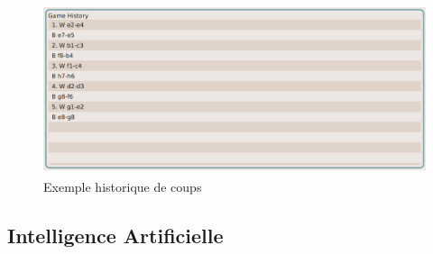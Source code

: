 \documentclass{article}
\begin{document}
\begin{figure}[h]
    \caption{Exemple historique de coups}
    \centering
    \includegraphics[width=\textwidth,height=5.0cm,keepaspectratio]{historique-coups}
\end{figure}

\subsection{Intelligence Artificielle} \label{AI}
\end{document}
